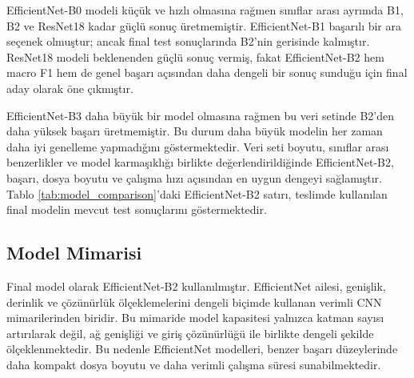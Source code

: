 \documentclass[conference]{IEEEtran}
\begin{document}
\begin{table}[H]
\centering
\caption{Denenen Model Adaylarının Karşılaştırılması}
\label{tab:model_comparison}
\scriptsize
{}
\end{table}

EfficientNet-B0 modeli küçük ve hızlı olmasına rağmen sınıflar arası
ayrımda B1, B2 ve ResNet18 kadar güçlü sonuç üretmemiştir. EfficientNet-B1
başarılı bir ara seçenek olmuştur; ancak final test sonuçlarında B2'nin
gerisinde kalmıştır. ResNet18 modeli beklenenden güçlü sonuç vermiş, fakat
EfficientNet-B2 hem macro F1 hem de genel başarı açısından daha dengeli
bir sonuç sunduğu için final aday olarak öne çıkmıştır.
\vspace{0.4cm}

EfficientNet-B3 daha büyük bir model olmasına rağmen bu veri setinde B2'den
daha yüksek başarı üretmemiştir. Bu durum daha büyük modelin her zaman daha
iyi genelleme yapmadığını göstermektedir. Veri seti boyutu, sınıflar arası
benzerlikler ve model karmaşıklığı birlikte değerlendirildiğinde
EfficientNet-B2, başarı, dosya boyutu ve çalışma hızı açısından en uygun
dengeyi sağlamıştır. Tablo \ref{tab:model_comparison}'daki EfficientNet-B2
satırı, teslimde kullanılan final modelin mevcut test sonuçlarını
göstermektedir.

\subsection{Model Mimarisi}

Final model olarak EfficientNet-B2 kullanılmıştır. EfficientNet ailesi,
genişlik, derinlik ve çözünürlük ölçeklemelerini dengeli biçimde kullanan
verimli CNN mimarilerinden biridir. Bu mimaride model kapasitesi yalnızca
katman sayısı artırılarak değil, ağ genişliği ve giriş çözünürlüğü ile
birlikte dengeli şekilde ölçeklenmektedir. Bu nedenle EfficientNet
modelleri, benzer başarı düzeylerinde daha kompakt dosya boyutu ve daha
verimli çalışma süresi sunabilmektedir.
\vspace{0.4cm}
\end{document}
